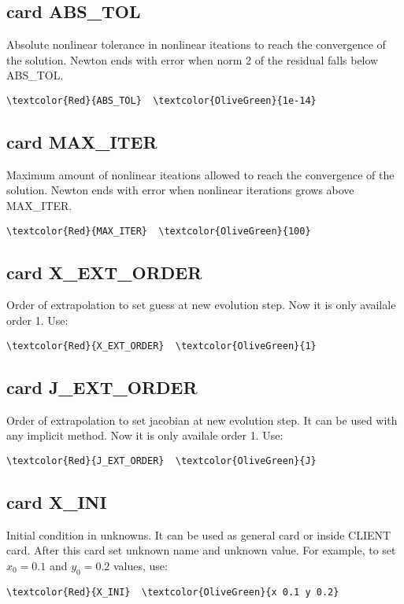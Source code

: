 \subsection{card ABS_TOL}
Absolute nonlinear tolerance in nonlinear iteations to reach the convergence of the solution. Newton ends with error when norm 2 of the residual falls below ABS_TOL.
\begin{Verbatim}[frame=single,commandchars=\\\{\}]
\textcolor{Red}{ABS_TOL}  \textcolor{OliveGreen}{1e-14}
\end{Verbatim}

\subsection{card MAX_ITER}
Maximum amount of nonlinear iteations allowed to reach the convergence of the solution. Newton ends with error when nonlinear iterations grows above MAX_ITER.
\begin{Verbatim}[frame=single,commandchars=\\\{\}]
\textcolor{Red}{MAX_ITER}  \textcolor{OliveGreen}{100}
\end{Verbatim}

\subsection{card X_EXT_ORDER}
Order of extrapolation to set guess at new evolution step. Now it is only availale order 1. Use:
\begin{Verbatim}[frame=single,commandchars=\\\{\}]
\textcolor{Red}{X_EXT_ORDER}  \textcolor{OliveGreen}{1}
\end{Verbatim}

\subsection{card J_EXT_ORDER}
Order of extrapolation to set jacobian at new evolution step. It can be used with any implicit method. Now it is only availale order 1. Use:
\begin{Verbatim}[frame=single,commandchars=\\\{\}]
\textcolor{Red}{J_EXT_ORDER}  \textcolor{OliveGreen}{J}
\end{Verbatim}


\subsection{card X_INI}
Initial condition in unknowns. It can be used as general card or inside CLIENT card. After this card set unknown name and unknown value. For example, to set $x_0=0.1$ and $y_0=0.2$ values, use:
\begin{Verbatim}[frame=single,commandchars=\\\{\}]
\textcolor{Red}{X_INI}  \textcolor{OliveGreen}{x 0.1 y 0.2}
\end{Verbatim}

